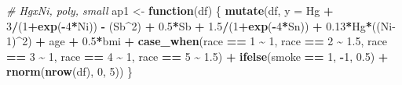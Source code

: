 \documentclass[12pt, twoside]{amherstthesis}
\newenvironment{Shaded}{\begin{snugshade}}{\end{snugshade}}
\newcommand{\AttributeTok}[1]{\textcolor[rgb]{0.13,0.29,0.53}{#1}}
\newcommand{\CommentTok}[1]{\textcolor[rgb]{0.56,0.35,0.01}{\textit{#1}}}
\newcommand{\ControlFlowTok}[1]{\textcolor[rgb]{0.13,0.29,0.53}{\textbf{#1}}}
\newcommand{\DecValTok}[1]{\textcolor[rgb]{0.00,0.00,0.81}{#1}}
\newcommand{\FloatTok}[1]{\textcolor[rgb]{0.00,0.00,0.81}{#1}}
\newcommand{\FunctionTok}[1]{\textcolor[rgb]{0.13,0.29,0.53}{\textbf{#1}}}
\newcommand{\NormalTok}[1]{#1}
\newcommand{\OtherTok}[1]{\textcolor[rgb]{0.56,0.35,0.01}{#1}}
\newcommand{\SpecialCharTok}[1]{\textcolor[rgb]{0.81,0.36,0.00}{\textbf{#1}}}
\begin{document}
\begin{Shaded}
\begin{Highlighting}[]
\CommentTok{\# HgxNi, poly, small}
\NormalTok{ap1 }\OtherTok{\textless{}{-}} \ControlFlowTok{function}\NormalTok{(df) \{}
  \FunctionTok{mutate}\NormalTok{(df, }\AttributeTok{y =} 
\NormalTok{           Hg }\SpecialCharTok{+} \DecValTok{3}\SpecialCharTok{/}\NormalTok{(}\DecValTok{1}\SpecialCharTok{+}\FunctionTok{exp}\NormalTok{(}\SpecialCharTok{{-}}\DecValTok{4}\SpecialCharTok{*}\NormalTok{Ni)) }\SpecialCharTok{{-}}\NormalTok{ (Sb}\SpecialCharTok{\^{}}\DecValTok{2}\NormalTok{) }\SpecialCharTok{+} \FloatTok{0.5}\SpecialCharTok{*}\NormalTok{Sb }\SpecialCharTok{+} \FloatTok{1.5}\SpecialCharTok{/}\NormalTok{(}\DecValTok{1}\SpecialCharTok{+}\FunctionTok{exp}\NormalTok{(}\SpecialCharTok{{-}}\DecValTok{4}\SpecialCharTok{*}\NormalTok{Sn)) }\SpecialCharTok{+} 
           \FloatTok{0.13}\SpecialCharTok{*}\NormalTok{Hg}\SpecialCharTok{*}\NormalTok{((Ni}\DecValTok{{-}1}\NormalTok{)}\SpecialCharTok{\^{}}\DecValTok{2}\NormalTok{) }\SpecialCharTok{+}
\NormalTok{           age }\SpecialCharTok{+} \FloatTok{0.5}\SpecialCharTok{*}\NormalTok{bmi }\SpecialCharTok{+} 
           \FunctionTok{case\_when}\NormalTok{(race }\SpecialCharTok{==} \DecValTok{1} \SpecialCharTok{\textasciitilde{}} \DecValTok{1}\NormalTok{, }
\NormalTok{                     race }\SpecialCharTok{==} \DecValTok{2} \SpecialCharTok{\textasciitilde{}} \FloatTok{1.5}\NormalTok{, }
\NormalTok{                     race }\SpecialCharTok{==} \DecValTok{3} \SpecialCharTok{\textasciitilde{}} \DecValTok{1}\NormalTok{, }
\NormalTok{                     race }\SpecialCharTok{==} \DecValTok{4} \SpecialCharTok{\textasciitilde{}} \DecValTok{1}\NormalTok{, }
\NormalTok{                     race }\SpecialCharTok{==} \DecValTok{5} \SpecialCharTok{\textasciitilde{}} \FloatTok{1.5}\NormalTok{) }\SpecialCharTok{+}
           \FunctionTok{ifelse}\NormalTok{(smoke }\SpecialCharTok{==} \DecValTok{1}\NormalTok{, }\SpecialCharTok{{-}}\DecValTok{1}\NormalTok{, }\FloatTok{0.5}\NormalTok{) }\SpecialCharTok{+}
           \FunctionTok{rnorm}\NormalTok{(}\FunctionTok{nrow}\NormalTok{(df), }\DecValTok{0}\NormalTok{, }\DecValTok{5}\NormalTok{))}
\NormalTok{\}}


\end{Highlighting}
\end{Shaded}
\end{document}
